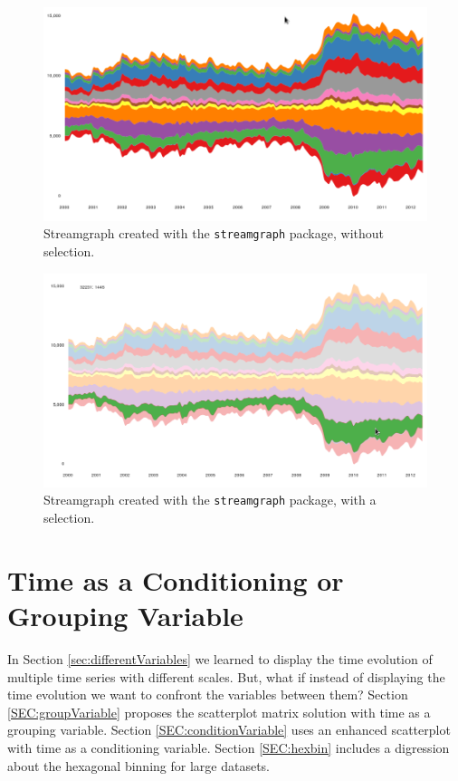\documentclass[smallroyalvopaper]{memoir}
\begin{document}
\begin{figure}[htbp]
\centering
\includegraphics[width=.9\linewidth]{figs/streamgraph_interactive.png}
\caption{Streamgraph created with the \texttt{streamgraph} package, without selection. \label{fig:streamgraph_interactive}}
\end{figure}

\begin{figure}[htbp]
\centering
\includegraphics[width=.9\linewidth]{figs/streamgraph_interactive_selected.png}
\caption{Streamgraph created with the \texttt{streamgraph} package, with a selection. \label{fig:streamgraph_interactive_selected}}
\end{figure}

\chapter{Time as a Conditioning or Grouping Variable}
\label{sec:orgbda5ceb}
\label{cha:timeGroupFactor}

In Section \ref{sec:differentVariables} we learned to display the time evolution of multiple time series with different scales. But, what if instead of displaying the time evolution we want to confront the variables between them? Section \ref{SEC:groupVariable} proposes the scatterplot matrix solution with time as a grouping variable. Section \ref{SEC:conditionVariable} uses an enhanced scatterplot with time as a conditioning variable. Section \ref{SEC:hexbin} includes a digression about the hexagonal binning for large datasets.
\end{document}
